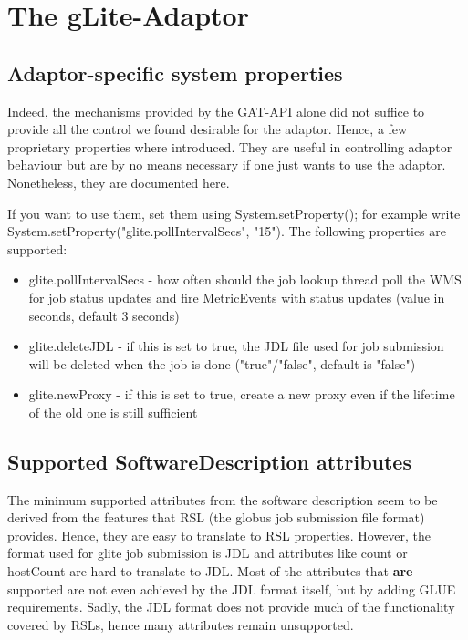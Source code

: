 \documentclass{scrreprt}
\begin{document}
\chapter{The gLite-Adaptor} 

\section{Adaptor-specific system properties}

Indeed, the mechanisms provided by the GAT-API alone did not suffice to provide all the control we found 
desirable for the adaptor. Hence, a few proprietary properties where introduced. They are useful
in controlling adaptor behaviour but are by no means necessary if one just wants to use the adaptor.
Nonetheless, they are documented here.
 
If you want to use them, set them using System.setProperty(); for example write 
System.setProperty("glite.pollIntervalSecs", "15").
The following properties are supported:

\begin{itemize}
 \item glite.pollIntervalSecs - how often should the job lookup thread poll the WMS for job status updates and fire MetricEvents with status updates (value in seconds, default 3 seconds)
 \item glite.deleteJDL - if this is set to true, the JDL file used for job submission will be deleted when the job is done ("true"/"false", default is "false")
 \item glite.newProxy - if this is set to true, create a new proxy even if the lifetime of the old one is still sufficient
\end{itemize}

\section{Supported SoftwareDescription attributes}

The minimum supported attributes from the software description seem to be derived from the features
that RSL (the globus job submission file format) provides. Hence, they are easy to translate to RSL 
properties.
However, the format used for glite job submission is JDL and attributes like count or hostCount are
hard to translate to JDL. Most of the attributes that \textbf{are} supported are not even achieved by the JDL
format itself, but by adding GLUE requirements.
Sadly, the JDL format does not provide much of the functionality covered by RSLs, hence many attributes
remain unsupported.
 
\end{document}
